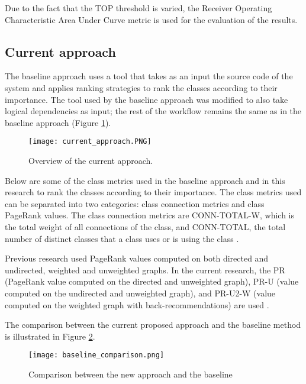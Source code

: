 Due to the fact that the TOP threshold is varied, the Receiver Operating Characteristic Area Under Curve metric is used for the evaluation of the results.



\subsection{Current approach}
\label{subsec:key_current_approach}

\hspace{4em}The baseline approach uses a tool that takes as an input the source code of the system and applies ranking strategies to rank the classes according to their importance. The tool used by the baseline approach was modified to also take logical dependencies as input; the rest of the workflow remains the same as in the baseline approach (Figure \ref{fig:baseline_approach}).
\begin{figure}[H]
\centering
\texttt{[image: current\_approach.PNG]}
\caption{Overview of the current approach.}
\label{fig:baseline_approach}
\end{figure}

Below are some of the class metrics used in the baseline approach and in this research to rank the classes according to their importance. The class metrics used can be separated into two categories: class connection metrics and class PageRank values. The class connection metrics are CONN-TOTAL-W, which is the total weight of all connections of the class, and CONN-TOTAL, the total number of distinct classes that a class uses or is using the class \cite{Finding-key-classes}.

Previous research used PageRank values computed on both directed and undirected, weighted and unweighted graphs. In the current research, the PR (PageRank value computed on the directed and unweighted graph), PR-U (value computed on the undirected and unweighted graph), and PR-U2-W (value computed on the weighted graph with back-recommendations) are used \cite{PagerankENASE, enase15, Finding-key-classes, PagerankSACI}.

The comparison between the current proposed approach and the baseline method is illustrated in Figure \ref{fig:baseline_comparison}. 
\begin{figure}[H]
\centering
\texttt{[image: baseline\_comparison.png]}
\caption{ Comparison between the new approach and the baseline }
\label{fig:baseline_comparison}
\centering
\end{figure}


